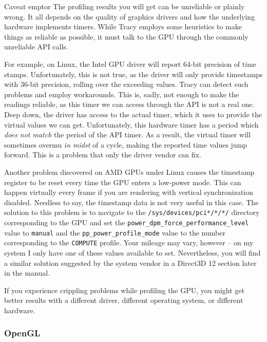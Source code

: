\documentclass[hidelinks,titlepage,a4paper,twoside]{article}
\begin{document}
\begin{bclogo}[
noborder=true,
couleur=black!5,
logo=\bcattention
]{Caveat emptor}
The profiling results you will get can be unreliable or plainly wrong. It all depends on the quality of graphics drivers and how the underlying hardware implements timers. While Tracy employs some heuristics to make things as reliable as possible, it must talk to the GPU through the commonly unreliable API calls.

For example, on Linux, the Intel GPU driver will report 64-bit precision of time stamps. Unfortunately, this is not true, as the driver will only provide timestamps with 36-bit precision, rolling over the exceeding values. Tracy can detect such problems and employ workarounds. This is, sadly, not enough to make the readings reliable, as this timer we can access through the API is not a real one. Deep down, the driver has access to the actual timer, which it uses to provide the virtual values we can get. Unfortunately, this hardware timer has a period which \emph{does not match} the period of the API timer. As a result, the virtual timer will sometimes overmu \emph{in midst} of a cycle, making the reported time values jump forward. This is a problem that only the driver vendor can fix.

Another problem discovered on AMD GPUs under Linux causes the timestamp register to be reset every time the GPU enters a low-power mode. This can happen virtually every frame if you are rendering with vertical synchronization disabled. Needless to say, the timestamp data is not very useful in this case. The solution to this problem is to navigate to the \texttt{/sys/devices/pci*/*/*/} directory corresponding to the GPU and set the \texttt{power\_dpm\_force\_performance\_level} value to \texttt{manual} and the \texttt{pp\_power\_profile\_mode} value to the number corresponding to the \texttt{COMPUTE} profile. Your mileage may vary, however -- on my system I only have one of these values available to set. Nevertheless, you will find a similar solution suggested by the system vendor in a Direct3D 12 section later in the manual.

If you experience crippling problems while profiling the GPU, you might get better results with a different driver, different operating system, or different hardware.
\end{bclogo}

\subsubsection{OpenGL}
\end{document}
